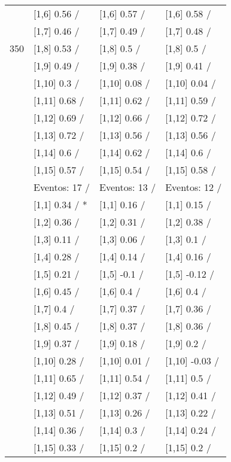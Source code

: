 \begin{table}
\begin{tabular}[t]{llll}
 & {}[1,6] 0.56  / & {}[1,6] 0.57  / & {}[1,6] 0.58  /\\
 & {}[1,7] 0.46  / & {}[1,7] 0.49  / & {}[1,7] 0.48  /\\
350 & {}[1,8] 0.53  / & {}[1,8] 0.5  / & {}[1,8] 0.5  /\\
\addlinespace
 & {}[1,9] 0.49  / & {}[1,9] 0.38  / & {}[1,9] 0.41  /\\
 & {}[1,10] 0.3  / & {}[1,10] 0.08  / & {}[1,10] 0.04  /\\
 & {}[1,11] 0.68  / & {}[1,11] 0.62  / & {}[1,11] 0.59  /\\
 & {}[1,12] 0.69  / & {}[1,12] 0.66  / & {}[1,12] 0.72  /\\
 & {}[1,13] 0.72  / & {}[1,13] 0.56  / & {}[1,13] 0.56  /\\
\addlinespace
 & {}[1,14] 0.6  / & {}[1,14] 0.62  / & {}[1,14] 0.6  /\\
 & {}[1,15] 0.57  / & {}[1,15] 0.54  / & {}[1,15] 0.58  /\\
 & Eventos:  17 / & Eventos:  13 / & Eventos:  12 /\\
 & {}[1,1] 0.34  / * & {}[1,1] 0.16  / & {}[1,1] 0.15  /\\
 & {}[1,2] 0.36  / & {}[1,2] 0.31  / & {}[1,2] 0.38  /\\
\addlinespace
 & {}[1,3] 0.11  / & {}[1,3] 0.06  / & {}[1,3] 0.1  /\\
 & {}[1,4] 0.28  / & {}[1,4] 0.14  / & {}[1,4] 0.16  /\\
 & {}[1,5] 0.21  / & {}[1,5] -0.1  / & {}[1,5] -0.12  /\\
 & {}[1,6] 0.45  / & {}[1,6] 0.4  / & {}[1,6] 0.4  /\\
 & {}[1,7] 0.4  / & {}[1,7] 0.37  / & {}[1,7] 0.36  /\\
\addlinespace
500 & {}[1,8] 0.45  / & {}[1,8] 0.37  / & {}[1,8] 0.36  /\\
 & {}[1,9] 0.37  / & {}[1,9] 0.18  / & {}[1,9] 0.2  /\\
 & {}[1,10] 0.28  / & {}[1,10] 0.01  / & {}[1,10] -0.03  /\\
 & {}[1,11] 0.65  / & {}[1,11] 0.54  / & {}[1,11] 0.5  /\\
 & {}[1,12] 0.49  / & {}[1,12] 0.37  / & {}[1,12] 0.41  /\\
\addlinespace
 & {}[1,13] 0.51  / & {}[1,13] 0.26  / & {}[1,13] 0.22  /\\
 & {}[1,14] 0.36  / & {}[1,14] 0.3  / & {}[1,14] 0.24  /\\
 & {}[1,15] 0.33  / & {}[1,15] 0.2  / & {}[1,15] 0.2  /\\
\bottomrule
\end{tabular}
\end{table}
